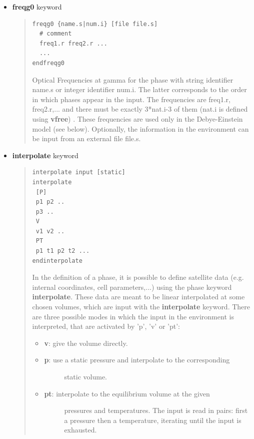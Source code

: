 \documentclass[a4paper]{article}
\begin{document}
\begin{itemize}
\begin{quote}
\end{quote}

\item \textbf{freqg0} keyword
%
\begin{quote}
%
\gibbslist
\begin{lstlisting}
freqg0 {name.s|num.i} [file file.s]
  # comment
  freq1.r freq2.r ...
  ...
endfreqg0
\end{lstlisting}

Optical Frequencies at gamma for the phase with string identifier
name.s or integer identifier num.i. The latter corresponds to the
order in which phases appear in the input. The frequencies are
freq1.r, freq2.r,... and there must be exactly 3*nat.i-3 of
them (nat.i is defined using \textbf{vfree}) . These frequencies are
used only in the Debye-Einstein model (see below). Optionally, the
information in the environment can be input from an external file
file.s.

\end{quote}

\item \textbf{interpolate} keyword
%
\begin{quote}
%
\gibbslist
\begin{lstlisting}
interpolate input [static]
interpolate
 [P]
 p1 p2 ..
 p3 ..
 V
 v1 v2 ..
 PT
 p1 t1 p2 t2 ...
endinterpolate
\end{lstlisting}

In the definition of a phase, it is possible to define satellite
data (e.g. internal coordinates, cell parameters,...) using the
phase keyword \textbf{interpolate}. These data are meant to be
linear interpolated at some chosen volumes, which are input with
the \textbf{interpolate} keyword. There are three possible modes in
which the input in the environment is interpreted, that are
activated by 'p', 'v' or 'pt':
%
\begin{itemize}

\item \textbf{v}: give the volume directly.

\item %
\begin{description}
\item[{\textbf{p}: use a static pressure and interpolate to the corresponding}] \leavevmode 
static volume.

\end{description}

\item %
\begin{description}
\item[{\textbf{pt}: interpolate to the equilibrium volume at the given}] \leavevmode 
pressures and temperatures. The input is read in pairs:
first a pressure then a temperature, iterating until the
input is exhausted.


\end{description}
\end{itemize}
\end{quote}
\end{itemize}
\end{document}
